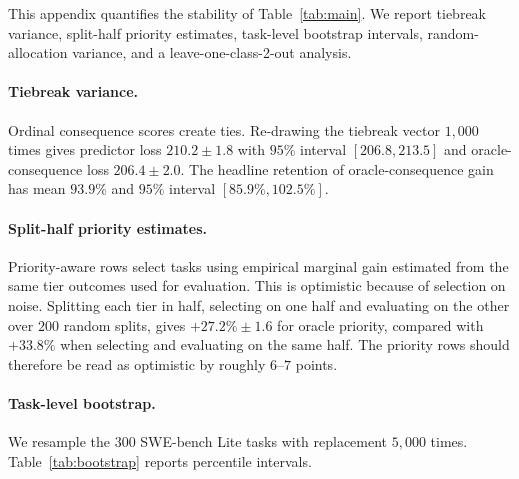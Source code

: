 \documentclass{article}
\begin{document}
This appendix quantifies the stability of Table~\ref{tab:main}. We
report tiebreak variance, split-half priority estimates, task-level
bootstrap intervals, random-allocation variance, and a
leave-one-class-2-out analysis.

\paragraph{Tiebreak variance.}
Ordinal consequence scores create ties. Re-drawing the tiebreak vector
$1{,}000$ times gives predictor loss $210.2\pm1.8$ with $95\%$
interval $[206.8,213.5]$ and oracle-consequence loss $206.4\pm2.0$.
The headline retention of oracle-consequence gain has mean $93.9\%$
and $95\%$ interval $[85.9\%,102.5\%]$.

\paragraph{Split-half priority estimates.}
Priority-aware rows select tasks using empirical marginal gain
estimated from the same tier outcomes used for evaluation. This is
optimistic because of selection on noise. Splitting each tier in half,
selecting on one half and evaluating on the other over $200$ random
splits, gives $+27.2\%\pm1.6$ for oracle priority, compared with
$+33.8\%$ when selecting and evaluating on the same half. The priority
rows should therefore be read as optimistic by roughly $6$--$7$ points.

\paragraph{Task-level bootstrap.}
We resample the $300$ SWE-bench Lite tasks with replacement $5{,}000$
times. Table~\ref{tab:bootstrap} reports percentile intervals.

\begin{table}[h]
\centering
\caption{\textbf{Task-level bootstrap} over $5{,}000$ resamples at the
top-$25\%$ matched-compute operating point.}
\label{tab:bootstrap}
\small
{}
\end{table}
\end{document}
